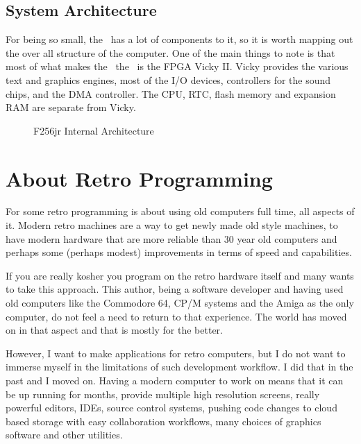 \subsection*{System Architecture}

For being so small, the \foenix\ has a lot of components to it, so it
is worth mapping out the over all structure of the computer. One of
the main things to note is that most of what makes the \foenix\ the
\foenix\ is the FPGA Vicky II. Vicky provides the various text and
graphics engines, most of the I/O devices, controllers for the sound
chips, and the DMA controller. The CPU, RTC, flash memory and
expansion RAM are separate from Vicky.

\begin{figure}[ht]
    \begin{center}
    \end{center}
    \caption{F256jr Internal Architecture}
    \label{fig:arch}
\end{figure}


\section*{About Retro Programming}

For some retro programming is about using old computers full time, all
aspects of it. Modern retro machines are a way to get newly made old
style machines, to have modern hardware that are more reliable than 30
year old computers and perhaps some (perhaps modest) improvements in
terms of speed and capabilities.

If you are really kosher you program on the retro hardware itself and
many wants to take this approach. This author, being a software
developer and having used old computers like the Commodore 64, CP/M
systems and the Amiga as the only computer, do not feel a need to
return to that experience. The world has moved on in that aspect and
that is mostly for the better.

However, I want to make applications for retro computers, but I do not
want to immerse myself in the limitations of such development
workflow. I did that in the past and I moved on. Having a modern
computer to work on means that it can be up running for months,
provide multiple high resolution screens, really powerful editors,
IDEs, source control systems, pushing code changes to cloud based
storage with easy collaboration workflows, many choices of graphics
software and other utilities.

